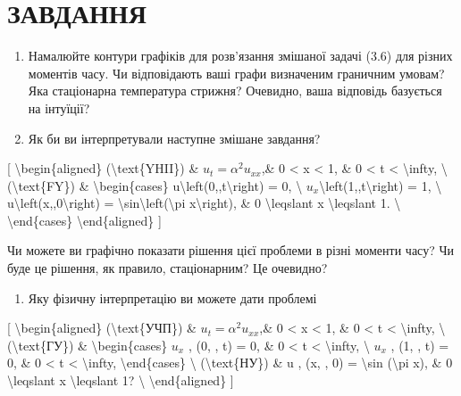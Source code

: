 \documentclass[
]{article}
\providecommand{\tightlist}{%
  \setlength{\itemsep}{0pt}\setlength{\parskip}{0pt}}
\begin{document}
\section{ЗАВДАННЯ}\label{ux437ux430ux432ux434ux430ux43dux43dux44f-1}

\begin{enumerate}
\def\labelenumi{\arabic{enumi}.}
\item
  Намалюйте контури графіків для розв'язання змішаної задачі (3.6) для
  різних моментів часу. Чи відповідають ваші графи визначеним граничним
  умовам? Яка стаціонарна температура стрижня? Очевидно, ваша відповідь
  базується на інтуїції?
\item
  Як би ви інтерпретували наступне змішане завдання?
\end{enumerate}

{[} \textbackslash begin\{aligned\} (\textbackslash text\{YHII\}) \&
\(u_t = \alpha^2 u_{xx}\),\& 0 \textless{} x \textless{} 1, \& 0
\textless{} t \textless{} \textbackslash infty, \textbackslash{}
(\textbackslash text\{FY\}) \& \textbackslash begin\{cases\}
u\textbackslash left(0,,t\textbackslash right) = 0, \textbackslash{}
\(u_x\)\textbackslash left(1,,t\textbackslash right) = 1,
\textbackslash{} u\textbackslash left(x,,0\textbackslash right) =
\textbackslash sin\textbackslash left(\textbackslash pi
x\textbackslash right), \& 0 \textbackslash leqslant x
\textbackslash leqslant 1. \textbackslash{} \textbackslash end\{cases\}
\textbackslash end\{aligned\} {]}

Чи можете ви графічно показати рішення цієї проблеми в різні моменти
часу? Чи буде це рішення, як правило, стаціонарним? Це очевидно?

\begin{enumerate}
\def\labelenumi{\arabic{enumi}.}
\setcounter{enumi}{2}
\tightlist
\item
  Яку фізичну інтерпретацію ви можете дати проблемі
\end{enumerate}

{[} \textbackslash begin\{aligned\} (\textbackslash text\{УЧП\}) \&
\(u_t = \alpha^2 u_{xx}\),\& 0 \textless{} x \textless{} 1, \& 0
\textless{} t \textless{} \textbackslash infty, \textbackslash{}
(\textbackslash text\{ГУ\}) \& \textbackslash begin\{cases\} \(u_x\) ,
(0, , t) = 0, \& 0 \textless{} t \textless{} \textbackslash infty,
\textbackslash{} \(u_x\) , (1, , t) = 0, \& 0 \textless{} t \textless{}
\textbackslash infty, \textbackslash end\{cases\} \textbackslash{}
(\textbackslash text\{НУ\}) \& u , (x, , 0) = \textbackslash sin
(\textbackslash pi x), \& 0 \textbackslash leqslant x
\textbackslash leqslant 1? \textbackslash{}
\textbackslash end\{aligned\} {]}
\end{document}
